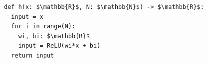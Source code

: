 \documentclass[border=10pt]{standalone}
\begin{document}
\begin{lstlisting}
def h(x: $\mathbb{R}$, N: $\mathbb{N}$) -> $\mathbb{R}$:
  input = x
  for i in range(N):
    wi, bi: $\mathbb{R}$
    input = ReLU(wi*x + bi)
  return input
\end{lstlisting}
\end{document}
